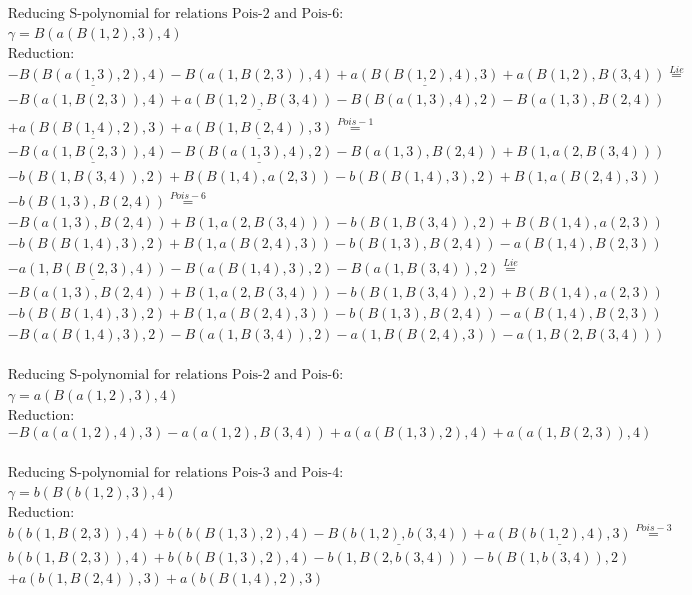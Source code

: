 \documentclass[11pt]{amsart}
\begin{document}
\begin{align*} 
& \text{Reducing S-polynomial for relations Pois-2 and Pois-6:} \\ 
& \gamma = B(a(B(1,2),3),4) \\ 
& \text{Reduction}: \\& - \underline{B(B(a(1,3),2),4)} - B(a(1,B(2,3)),4) + \underline{a(B(B(1,2),4),3)} + a(B(1,2),B(3,4)) \stackrel{ Lie }{=}  \\ 
& - B(a(1,B(2,3)),4) + \underline{a(B(1,2),B(3,4))} - B(B(a(1,3),4),2) - B(a(1,3),B(2,4))\\ 
 &  + \underline{a(B(B(1,4),2),3)} + \underline{a(B(1,B(2,4)),3)} \stackrel{ Pois-1 }{=}  \\ 
& - \underline{B(a(1,B(2,3)),4)} - \underline{B(B(a(1,3),4),2)} - B(a(1,3),B(2,4)) + B(1,a(2,B(3,4)))\\ 
 &  - b(B(1,B(3,4)),2) + B(B(1,4),a(2,3)) - b(B(B(1,4),3),2) + B(1,a(B(2,4),3))\\ 
 &  - b(B(1,3),B(2,4)) \stackrel{ Pois-6 }{=}  \\ 
& - B(a(1,3),B(2,4)) + B(1,a(2,B(3,4))) - b(B(1,B(3,4)),2) + B(B(1,4),a(2,3))\\ 
 &  - b(B(B(1,4),3),2) + B(1,a(B(2,4),3)) - b(B(1,3),B(2,4)) - a(B(1,4),B(2,3))\\ 
 &  - \underline{a(1,B(B(2,3),4))} - B(a(B(1,4),3),2) - B(a(1,B(3,4)),2) \stackrel{ Lie }{=}  \\ 
& - B(a(1,3),B(2,4)) + B(1,a(2,B(3,4))) - b(B(1,B(3,4)),2) + B(B(1,4),a(2,3))\\ 
 &  - b(B(B(1,4),3),2) + B(1,a(B(2,4),3)) - b(B(1,3),B(2,4)) - a(B(1,4),B(2,3))\\ 
 &  - B(a(B(1,4),3),2) - B(a(1,B(3,4)),2) - a(1,B(B(2,4),3)) - a(1,B(2,B(3,4)))\\ 
\end{align*} 
 
\begin{align*} 
& \text{Reducing S-polynomial for relations Pois-2 and Pois-6:} \\ 
& \gamma = a(B(a(1,2),3),4) \\ 
& \text{Reduction}: \\& - B(a(a(1,2),4),3) - a(a(1,2),B(3,4)) + a(a(B(1,3),2),4) + a(a(1,B(2,3)),4)\\ 
\end{align*} 
 
\begin{align*} 
& \text{Reducing S-polynomial for relations Pois-3 and Pois-4:} \\ 
& \gamma = b(B(b(1,2),3),4) \\ 
& \text{Reduction}: \\&b(b(1,B(2,3)),4) + b(b(B(1,3),2),4) - \underline{B(b(1,2),b(3,4))} + \underline{a(B(b(1,2),4),3)} \stackrel{ Pois-3 }{=}  \\ 
&b(b(1,B(2,3)),4) + b(b(B(1,3),2),4) - b(1,B(2,b(3,4))) - b(B(1,b(3,4)),2)\\ 
 &  + a(b(1,B(2,4)),3) + a(b(B(1,4),2),3)\\ 
\end{align*} 
 
\end{document}
